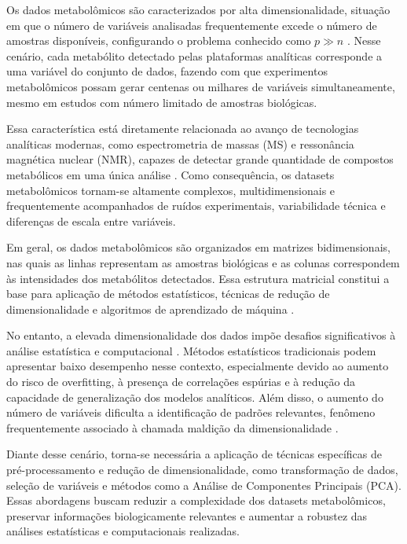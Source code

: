 Os dados metabolômicos são caracterizados por alta dimensionalidade, situação em que o número de variáveis analisadas frequentemente excede o número de amostras disponíveis, configurando o problema conhecido como $p \gg n$ \cite{gunawan2022data}. Nesse cenário, cada metabólito detectado pelas plataformas analíticas corresponde a uma variável do conjunto de dados, fazendo com que experimentos metabolômicos possam gerar centenas ou milhares de variáveis simultaneamente, mesmo em estudos com número limitado de amostras biológicas.

Essa característica está diretamente relacionada ao avanço de tecnologias analíticas modernas, como espectrometria de massas (MS) e ressonância magnética nuclear (NMR), capazes de detectar grande quantidade de compostos metabólicos em uma única análise \cite{NMR}. Como consequência, os datasets metabolômicos tornam-se altamente complexos, multidimensionais e frequentemente acompanhados de ruídos experimentais, variabilidade técnica e diferenças de escala entre variáveis.

Em geral, os dados metabolômicos são organizados em matrizes bidimensionais, nas quais as linhas representam as amostras biológicas e as colunas correspondem às intensidades dos metabólitos detectados. Essa estrutura matricial constitui a base para aplicação de métodos estatísticos, técnicas de redução de dimensionalidade e algoritmos de aprendizado de máquina \cite{gunawan2022data}.

No entanto, a elevada dimensionalidade dos dados impõe desafios significativos à análise estatística e computacional \cite{shahjaman2021rmisbeta}. Métodos estatísticos tradicionais podem apresentar baixo desempenho nesse contexto, especialmente devido ao aumento do risco de overfitting, à presença de correlações espúrias e à redução da capacidade de generalização dos modelos analíticos. Além disso, o aumento do número de variáveis dificulta a identificação de padrões relevantes, fenômeno frequentemente associado à chamada maldição da dimensionalidade \cite{gunawan2022data}.

Diante desse cenário, torna-se necessária a aplicação de técnicas específicas de pré-processamento e redução de dimensionalidade, como transformação de dados, seleção de variáveis e métodos como a Análise de Componentes Principais (PCA). Essas abordagens buscam reduzir a complexidade dos datasets metabolômicos, preservar informações biologicamente relevantes e aumentar a robustez das análises estatísticas e computacionais realizadas.

